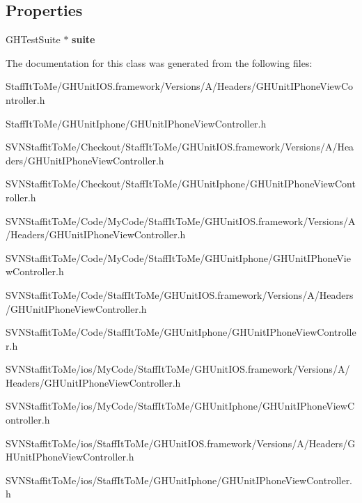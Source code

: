 \subsection*{\-Properties}
\begin{DoxyCompactItemize}
\item 
\hypertarget{interface_g_h_unit_i_phone_view_controller_a7dd15307e8b7e07854ab9cd708af967c}{
\-G\-H\-Test\-Suite $\ast$ {\bfseries suite}}
\label{interface_g_h_unit_i_phone_view_controller_a7dd15307e8b7e07854ab9cd708af967c}

\end{DoxyCompactItemize}


\-The documentation for this class was generated from the following files\-:\begin{DoxyCompactItemize}
\item 
\-Staff\-It\-To\-Me/\-G\-H\-Unit\-I\-O\-S.\-framework/\-Versions/\-A/\-Headers/\-G\-H\-Unit\-I\-Phone\-View\-Controller.\-h\item 
\-Staff\-It\-To\-Me/\-G\-H\-Unit\-Iphone/\-G\-H\-Unit\-I\-Phone\-View\-Controller.\-h\item 
\-S\-V\-N\-Staffit\-To\-Me/\-Checkout/\-Staff\-It\-To\-Me/\-G\-H\-Unit\-I\-O\-S.\-framework/\-Versions/\-A/\-Headers/\-G\-H\-Unit\-I\-Phone\-View\-Controller.\-h\item 
\-S\-V\-N\-Staffit\-To\-Me/\-Checkout/\-Staff\-It\-To\-Me/\-G\-H\-Unit\-Iphone/\-G\-H\-Unit\-I\-Phone\-View\-Controller.\-h\item 
\-S\-V\-N\-Staffit\-To\-Me/\-Code/\-My\-Code/\-Staff\-It\-To\-Me/\-G\-H\-Unit\-I\-O\-S.\-framework/\-Versions/\-A/\-Headers/\-G\-H\-Unit\-I\-Phone\-View\-Controller.\-h\item 
\-S\-V\-N\-Staffit\-To\-Me/\-Code/\-My\-Code/\-Staff\-It\-To\-Me/\-G\-H\-Unit\-Iphone/\-G\-H\-Unit\-I\-Phone\-View\-Controller.\-h\item 
\-S\-V\-N\-Staffit\-To\-Me/\-Code/\-Staff\-It\-To\-Me/\-G\-H\-Unit\-I\-O\-S.\-framework/\-Versions/\-A/\-Headers/\-G\-H\-Unit\-I\-Phone\-View\-Controller.\-h\item 
\-S\-V\-N\-Staffit\-To\-Me/\-Code/\-Staff\-It\-To\-Me/\-G\-H\-Unit\-Iphone/\-G\-H\-Unit\-I\-Phone\-View\-Controller.\-h\item 
\-S\-V\-N\-Staffit\-To\-Me/ios/\-My\-Code/\-Staff\-It\-To\-Me/\-G\-H\-Unit\-I\-O\-S.\-framework/\-Versions/\-A/\-Headers/\-G\-H\-Unit\-I\-Phone\-View\-Controller.\-h\item 
\-S\-V\-N\-Staffit\-To\-Me/ios/\-My\-Code/\-Staff\-It\-To\-Me/\-G\-H\-Unit\-Iphone/\-G\-H\-Unit\-I\-Phone\-View\-Controller.\-h\item 
\-S\-V\-N\-Staffit\-To\-Me/ios/\-Staff\-It\-To\-Me/\-G\-H\-Unit\-I\-O\-S.\-framework/\-Versions/\-A/\-Headers/\-G\-H\-Unit\-I\-Phone\-View\-Controller.\-h\item 
\-S\-V\-N\-Staffit\-To\-Me/ios/\-Staff\-It\-To\-Me/\-G\-H\-Unit\-Iphone/\-G\-H\-Unit\-I\-Phone\-View\-Controller.\-h\end{DoxyCompactItemize}
